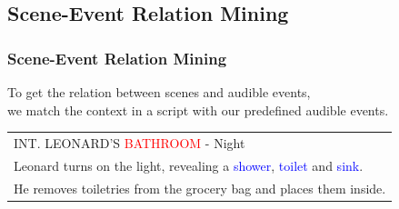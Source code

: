 \documentclass[xcolor=table,slidestop,compress,mathserif]{beamer}
\begin{document}
\subsection{Scene-Event Relation Mining}
\begin{frame}
	\frametitle{Scene-Event Relation Mining}
	To get the relation between scenes and audible events, \\ 
	we match the context in a script with our predefined audible events. \\ 
	\begin{table}[h]
		\begin{tabular}{|l|}
		\hline
		INT. LEONARD'S \textcolor{red}{BATHROOM} - Night \\ 
		Leonard turns on the light, revealing a \textcolor{blue}{shower}, \textcolor{blue}{toilet} and \textcolor{blue}{sink}.\\
		He removes toiletries from the grocery bag and places them inside. \\ 
		\hline
		\end{tabular}
	\end{table}
\end{frame}
\end{document}
